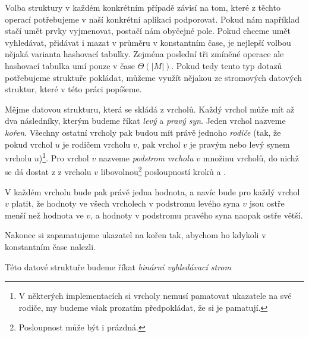 Volba struktury v každém konkrétním případě závisí na tom, které z těchto
operací potřebujeme v naší konkrétní aplikaci podporovat. Pokud nám například
stačí umět prvky vyjmenovat, postačí nám obyčejné pole. Pokud chceme umět
vyhledávat, přidávat i mazat v průměru v konstantním čase, je nejlepší volbou nějaká
varianta hashovací tabulky. Zejména poslední tři zmíněné operace ale hashovací
tabulka umí pouze v čase $\Theta(|M|)$. Pokud tedy tento typ dotazů potřebujeme
struktuře pokládat, můžeme využít nějakou ze stromových datových struktur,
které v této práci popíšeme.

\begin{definice}
Mějme datovou strukturu, která se skládá z vrcholů. Každý vrchol může mít až
dva následníky, kterým budeme říkat \emph{levý} a \emph{pravý syn}. Jeden
vrchol nazveme \emph{kořen}. Všechny ostatní vrcholy pak budou mít právě
jednoho \emph{rodiče} (tak, že pokud vrchol $u$ je rodičem vrcholu $v$, pak
vrchol $v$ je pravým nebo levý synem vrcholu $u$)\footnote{V některých
implementacích si vrcholy nemusí pamatovat ukazatele na své rodiče, my budeme
však prozatím předpokládat, že si je pamatují.}. Pro vrchol $v$ nazveme
\emph{podstrom vrcholu $v$} množinu vrcholů, do nichž se dá dostat z z vrcholu
$v$ libovolnou\footnote{Posloupnost může být i prázdná.} posloupností kroků 
 a .

V každém vrcholu bude pak právě jedna hodnota, a navíc bude pro každý vrchol $v$ platit, že hodnoty ve všech vrcholech v podstromu levého syna $v$ jsou ostře menší než hodnota ve $v$, a hodnoty v podstromu pravého syna naopak ostře větší.

Nakonec si zapamatujeme ukazatel na kořen tak, abychom ho kdykoli v konstantním čase nalezli.

Této datové struktuře budeme říkat \emph{binární vyhledávací strom}
\end{definice}

